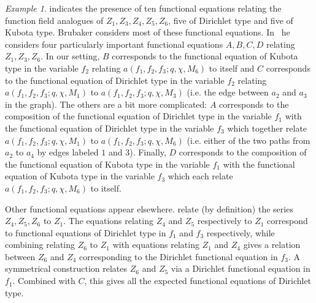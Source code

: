 \documentclass[11pt,letterpaper]{article}
\theoremstyle{definition}
\theoremstyle{remark}
\newtheorem{example}[theorem]{Example}
\numberwithin{equation}{section}
\theoremstyle{dotless}
\begin{document}
\begin{example}
\cite[\S8.3.1]{AndruskiewitschAngiono} indicates the presence of ten functional equations relating the function field analogues of $Z_1,Z_3,Z_4,Z_5,Z_6$, five of Dirichlet type and five of Kubota type. Brubaker considers most of these functional equations. In~\cite[\S1.4]{BrubakerThesis} he considers four particularly important functional equations $A,B,C,D$ relating $Z_1, Z_3, Z_6$. In our setting, $B$ corresponds to the functional equation of Kubota type in the variable $f_2$ relating $a (f_1,f_2,f_3; q, \chi, M_6)$ to itself and $C$ corresponds to the functional equation of Dirichlet type in the variable $f_2$ relating $a (f_1,f_2,f_3; q, \chi, M_1)$ to $a (f_1,f_2,f_3; q, \chi, M_3)$ (i.e. the edge between $a_2$ and $a_3$ in the graph). The others are a bit more complicated: $A$ corresponds to the composition of the functional equation of Dirichlet type in the variable $f_1$ with the functional equation of Dirichlet type in the variable $f_3$ which together relate $a (f_1,f_2,f_3; q, \chi, M_1)$ to $a (f_1,f_2,f_3; q, \chi, M_6)$ (i.e. either of the two paths from $a_2$ to $a_4$ by edges labeled $1$ and $3$). Finally, $D$ corresponds to the composition of the functional equation of Kubota type in the variable $f_1$ with the functional equation of Kubota type in the variable $f_3$ which each relate $a (f_1,f_2,f_3; q, \chi, M_6)$ to itself. 

Other functional equations appear elsewhere. \cite[(3.4),(3.5),(3.6)]{BrubakerThesis} relate (by definition) the series $Z_4, Z_5, Z_6$ to $Z_1$. The equations \cite[(3.4) and (3.5)]{BrubakerThesis} relating $Z_4$ and $Z_5$ respectively to $Z_1$ correspond to functional equations of Dirichlet type in $f_1$ and $f_3$ respectively, while combining \cite[(3.6)]{BrubakerThesis} relating $Z_6$ to $Z_1$ with equations \cite[(3.4)]{BrubakerThesis} relating $Z_1$ and $Z_4$ gives a relation between $Z_6$ and $Z_4$ corresponding to the Dirichlet functional equation in $f_3$. A symmetrical construction relates $Z_6$ and $Z_5$ via a Dirichlet functional equation in $f_1$. Combined with $C$, this gives all the expected functional equations of Dirichlet type.


\end{example}
\end{document}
